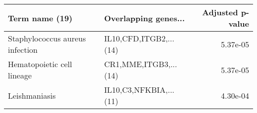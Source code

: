 \begin{tabular}{llr}
\toprule
                 Term name (19) &   Overlapping genes... &  Adjusted p-value \\
\midrule
Staphylococcus aureus infection & IL10,CFD,ITGB2,...(14) &          5.37e-05 \\
     Hematopoietic cell lineage &  CR1,MME,ITGB3,...(14) &          5.37e-05 \\
                  Leishmaniasis & IL10,C3,NFKBIA,...(11) &          4.30e-04 \\
\bottomrule
\end{tabular}
